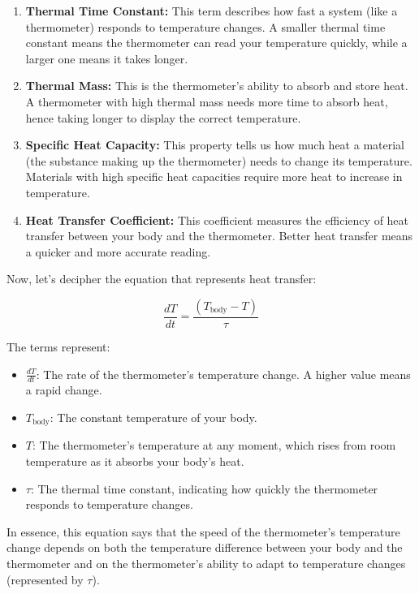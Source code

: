 \documentclass[12pt]{article}
\begin{document}
\begin{enumerate}
  \item \textbf{Thermal Time Constant:} This term describes how fast a system (like a thermometer) responds to temperature changes. A smaller thermal time constant means the thermometer can read your temperature quickly, while a larger one means it takes longer.

  \item \textbf{Thermal Mass:} This is the thermometer's ability to absorb and store heat. A thermometer with high thermal mass needs more time to absorb heat, hence taking longer to display the correct temperature.

  \item \textbf{Specific Heat Capacity:} This property tells us how much heat a material (the substance making up the thermometer) needs to change its temperature. Materials with high specific heat capacities require more heat to increase in temperature.

  \item \textbf{Heat Transfer Coefficient:} This coefficient measures the efficiency of heat transfer between your body and the thermometer. Better heat transfer means a quicker and more accurate reading.
\end{enumerate}

Now, let's decipher the equation that represents heat transfer:

\[
\frac{dT}{dt} = \frac{(T_{\text{body}} - T)}{\tau}
\]

The terms represent:
\begin{itemize}
  \item \(\frac{dT}{dt}\): The rate of the thermometer’s temperature change. A higher value means a rapid change.
  
  \item \(T_{\text{body}}\): The constant temperature of your body.
  
  \item \(T\): The thermometer’s temperature at any moment, which rises from room temperature as it absorbs your body’s heat.
  
  \item \(\tau\): The thermal time constant, indicating how quickly the thermometer responds to temperature changes.
\end{itemize}

In essence, this equation says that the speed of the thermometer's temperature change depends on both the temperature difference between your body and the thermometer and on the thermometer's ability to adapt to temperature changes (represented by \(\tau\)).
\end{document}
